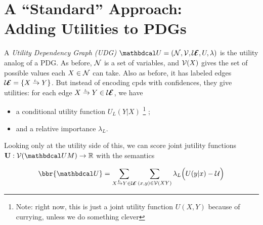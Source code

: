 \documentclass{article}
\newcommand\UEd{\mathcal U\!\!\Ed}
\begin{document}
    \section{A ``Standard'' Approach:\texorpdfstring\\{}
        Adding Utilities to PDGs}
    
    \begin{defn}
        A \emph{Utility Dependency Graph (UDG)}  $\dg U = (\N, \V, \UEd, U, \lambda)$ is the utility analog of a PDG.  As before, $\mathcal N$ is a set of variables, and $\mathcal V(X)$ gives the set of possible values each $X \in \mathcal N$ can take. 
        Also as before, it has labeled edges $\UEd = \{ \ed {L}XY \} $. But instead of encoding cpds with confidences, they give utilities: for each edge $\ed LXY \in \UEd$, we have 
        \begin{itemize}
            \item  a conditional utility function $U_L(Y|X)$%
                \footnote{Note: right now, this is just a joint utility function $U(X,Y)$ because of currying, unless we do something clever}%
            ;
            \item and a relative importance $\lambda_L$.
        \end{itemize}
    \end{defn}
    
    Looking only at the utility side of this, we can score joint jutility functions $\mathbf U : \V(\dg {UM}) \to \mathbb R$ with the semantics
    
    \begin{equation}
        \bbr{\dg U} =
             \sum_{\ed LXY \in \UEd}\sum_{(x,y) \in \V(XY)} \lambda_L \Big( U(y|x) - \mathcal U \Big)
    \end{equation}
\end{document}
